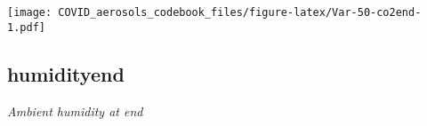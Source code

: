 \documentclass[]{article}
\begin{document}
\begin{minipage}{0.25 \textwidth}

\texttt{[image: COVID\_aerosols\_codebook\_files/figure-latex/Var-50-co2end-1.pdf]}

\end{minipage}

\noindent\makebox[\linewidth]{\rule{\textwidth}{0.4pt}}

\hypertarget{humidityend}{%
\subsection{humidityend}\label{humidityend}}

\emph{Ambient humidity at end}

\begin{minipage}{0.75 \textwidth}


\end{minipage}
\end{document}
